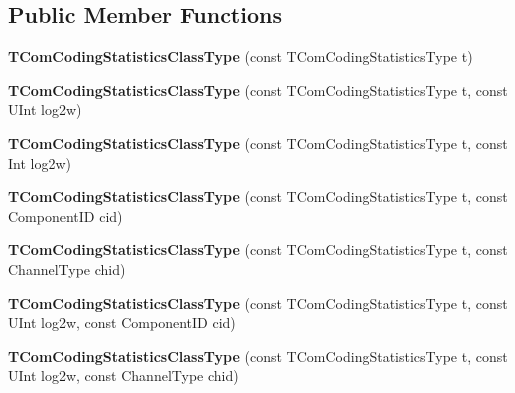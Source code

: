 \subsection*{Public Member Functions}
\begin{DoxyCompactItemize}
\item 
\mbox{\label{class_t_com_coding_statistics_class_type_a88751b1f1a6fe41e75ece1c8d9766402}} 
{\bfseries T\+Com\+Coding\+Statistics\+Class\+Type} (const T\+Com\+Coding\+Statistics\+Type t)
\item 
\mbox{\label{class_t_com_coding_statistics_class_type_a13d88a4f22981629ec3a1a8012e830b1}} 
{\bfseries T\+Com\+Coding\+Statistics\+Class\+Type} (const T\+Com\+Coding\+Statistics\+Type t, const U\+Int log2w)
\item 
\mbox{\label{class_t_com_coding_statistics_class_type_a198b7cf95ded93942108277a1336f920}} 
{\bfseries T\+Com\+Coding\+Statistics\+Class\+Type} (const T\+Com\+Coding\+Statistics\+Type t, const Int log2w)
\item 
\mbox{\label{class_t_com_coding_statistics_class_type_a9b1644b33eff02fe4d877827315f050f}} 
{\bfseries T\+Com\+Coding\+Statistics\+Class\+Type} (const T\+Com\+Coding\+Statistics\+Type t, const Component\+ID cid)
\item 
\mbox{\label{class_t_com_coding_statistics_class_type_a5db55ca6413e10aa551a4657bf89474c}} 
{\bfseries T\+Com\+Coding\+Statistics\+Class\+Type} (const T\+Com\+Coding\+Statistics\+Type t, const Channel\+Type chid)
\item 
\mbox{\label{class_t_com_coding_statistics_class_type_aaa0234c158956182677d3ce63288c4b1}} 
{\bfseries T\+Com\+Coding\+Statistics\+Class\+Type} (const T\+Com\+Coding\+Statistics\+Type t, const U\+Int log2w, const Component\+ID cid)
\item 
\mbox{\label{class_t_com_coding_statistics_class_type_ad0ca4c3a189d46ffbd9528edba0c982d}} 
{\bfseries T\+Com\+Coding\+Statistics\+Class\+Type} (const T\+Com\+Coding\+Statistics\+Type t, const U\+Int log2w, const Channel\+Type chid)
\end{DoxyCompactItemize}

